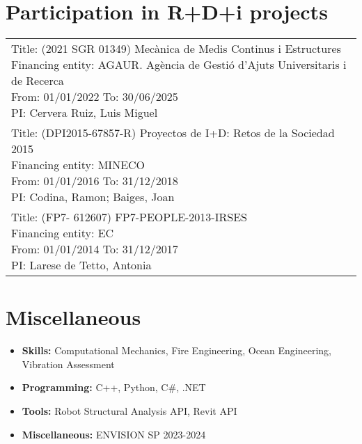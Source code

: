 \documentclass[12pt]{article}
\begin{document}
\section{Participation in R+D+i projects}
\begin{tabularx}{\linewidth}{l}
    \parbox{\linewidth}{
        Title: (2021 SGR 01349) Mecànica de Medis Continus i Estructures\\
        Financing entity: AGAUR. Agència de Gestió d'Ajuts Universitaris i de Recerca\\
        From: 01/01/2022 To: 30/06/2025\\
        PI: Cervera Ruiz, Luis Miguel
    }\\[2.5em]
    \parbox{\linewidth}{
        Title: (DPI2015-67857-R) Proyectos de I+D: Retos de la Sociedad 2015\\
        Financing entity: MINECO\\
        From: 01/01/2016 To: 31/12/2018\\
        PI: Codina, Ramon; Baiges, Joan
    }\\[2.5em]
    \parbox{\linewidth}{
        Title: (FP7- 612607) FP7-PEOPLE-2013-IRSES\\
        Financing entity: EC\\
        From: 01/01/2014 To: 31/12/2017\\
        PI: Larese de Tetto, Antonia
    }
\end{tabularx}


\section{Miscellaneous}
\begin{itemize}
    \itemsep=-.3em
    \item \textbf{Skills:} Computational Mechanics, Fire Engineering, Ocean Engineering, Vibration Assessment
    \item \textbf{Programming:} C++, Python, C\#, .NET
    \item \textbf{Tools:} Robot Structural Analysis API, Revit API
    \item \textbf{Miscellaneous:} ENVISION SP 2023-2024
\end{itemize}
\end{document}
